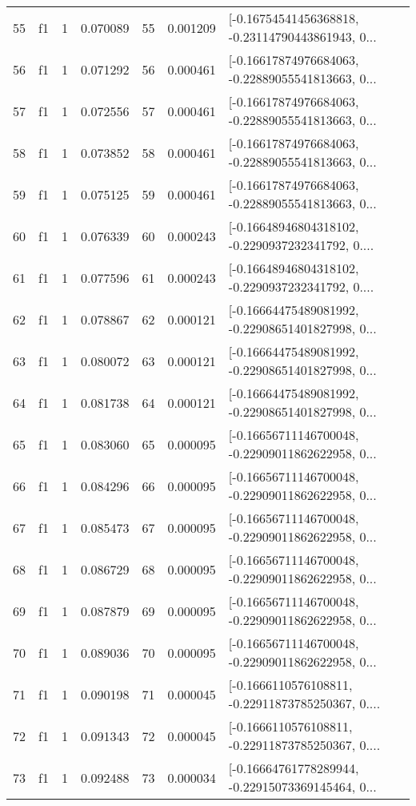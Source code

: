 \begin{tabular}{lllrlrl}
55  &  f1 &   1 &  0.070089 &   55 &  0.001209 &  [-0.16754541456368818, -0.23114790443861943, 0... \\
56  &  f1 &   1 &  0.071292 &   56 &  0.000461 &  [-0.16617874976684063, -0.22889055541813663, 0... \\
57  &  f1 &   1 &  0.072556 &   57 &  0.000461 &  [-0.16617874976684063, -0.22889055541813663, 0... \\
58  &  f1 &   1 &  0.073852 &   58 &  0.000461 &  [-0.16617874976684063, -0.22889055541813663, 0... \\
59  &  f1 &   1 &  0.075125 &   59 &  0.000461 &  [-0.16617874976684063, -0.22889055541813663, 0... \\
60  &  f1 &   1 &  0.076339 &   60 &  0.000243 &  [-0.16648946804318102, -0.2290937232341792, 0.... \\
61  &  f1 &   1 &  0.077596 &   61 &  0.000243 &  [-0.16648946804318102, -0.2290937232341792, 0.... \\
62  &  f1 &   1 &  0.078867 &   62 &  0.000121 &  [-0.16664475489081992, -0.22908651401827998, 0... \\
63  &  f1 &   1 &  0.080072 &   63 &  0.000121 &  [-0.16664475489081992, -0.22908651401827998, 0... \\
64  &  f1 &   1 &  0.081738 &   64 &  0.000121 &  [-0.16664475489081992, -0.22908651401827998, 0... \\
65  &  f1 &   1 &  0.083060 &   65 &  0.000095 &  [-0.16656711146700048, -0.22909011862622958, 0... \\
66  &  f1 &   1 &  0.084296 &   66 &  0.000095 &  [-0.16656711146700048, -0.22909011862622958, 0... \\
67  &  f1 &   1 &  0.085473 &   67 &  0.000095 &  [-0.16656711146700048, -0.22909011862622958, 0... \\
68  &  f1 &   1 &  0.086729 &   68 &  0.000095 &  [-0.16656711146700048, -0.22909011862622958, 0... \\
69  &  f1 &   1 &  0.087879 &   69 &  0.000095 &  [-0.16656711146700048, -0.22909011862622958, 0... \\
70  &  f1 &   1 &  0.089036 &   70 &  0.000095 &  [-0.16656711146700048, -0.22909011862622958, 0... \\
71  &  f1 &   1 &  0.090198 &   71 &  0.000045 &  [-0.1666110576108811, -0.22911873785250367, 0.... \\
72  &  f1 &   1 &  0.091343 &   72 &  0.000045 &  [-0.1666110576108811, -0.22911873785250367, 0.... \\
73  &  f1 &   1 &  0.092488 &   73 &  0.000034 &  [-0.16664761778289944, -0.22915073369145464, 0... \\

\end{tabular}
